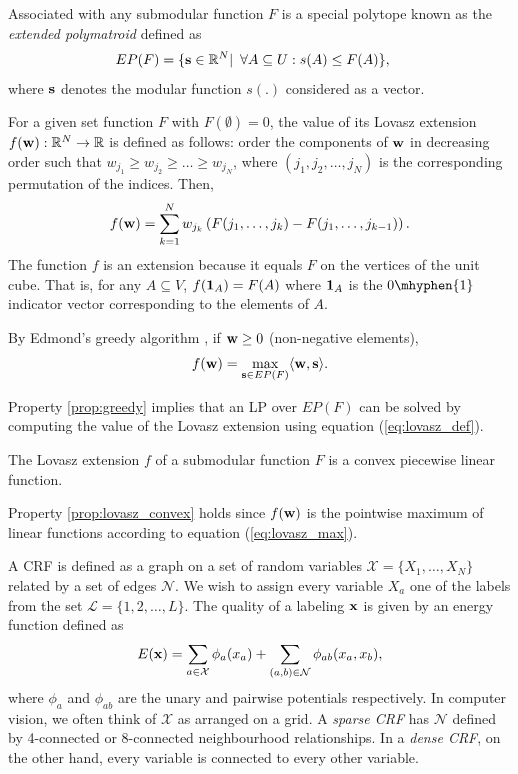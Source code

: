  Associated with any submodular function $F$ is a special polytope known as the {\it extended polymatroid} defined as
%
\begin{align}
EP(F) &= \{{\bf s} \in \mathbb{R}^N | \enskip \forall A \subseteq U: s(A) \leq F(A)\},
\label{eq:epf}
\end{align}
where $\bf s$ denotes the modular function $s(.)$ considered as a vector. 

 For a given set function $F$ with $F(\emptyset) = 0$, the value of its Lovasz extension $f({\bf w}): \mathbb{R}^N \to \mathbb{R}$ is defined as follows: order the components of $\bf w$ in decreasing order such that $w_{j_1} \geq w_{j_2} \geq \dots \geq w_{j_N}$, where $(j_1, j_2, \dots, j_N)$ is the corresponding permutation of the indices. Then,
%
\begin{align}
    f({\bf w}) = \sum_{k = 1}^{N} w_{j_k} \left(F(j_1, \dots, j_k) - F(j_1,
    \dots, j_{k - 1})\right).
    \label{eq:lovasz_def}
\end{align}
%
The function $f$ is an extension because it equals $F$ on the vertices of the
unit cube. That is, for any $A \subseteq V$, $f({\bf 1}_A) = F(A)$ where ${\bf
1}_A$ is the $0\mhyphen{1}$ indicator vector corresponding to the elements of $A$.

{\prop By Edmond's greedy algorithm \citep{edmonds1970submodular}, if ${\bf w} \geq 0$ (non-negative elements), 
\begin{equation}
    f({\bf w}) = \max_{{\bf s} \in EP(F)} \langle {\bf w}, {\bf s} \rangle.
    \label{eq:lovasz_max}
\end{equation}
\label{prop:greedy}}

Property \ref{prop:greedy} implies that an LP over $EP(F)$ can be solved by computing the value of the Lovasz extension using equation (\ref{eq:lovasz_def}).

{\prop The Lovasz extension $f$ of a submodular function $F$ is a convex piecewise linear function.\label{prop:lovasz_convex}}

Property \ref{prop:lovasz_convex} holds since $f({\bf w})$ is the pointwise maximum of linear functions according to equation (\ref{eq:lovasz_max}).

A CRF is defined as a graph on a set of random variables ${\mathcal X} = \{X_1,\dots, X_N\}$ related by a set of edges $\mathcal N$. We wish to assign every variable $X_a$ one of the labels from the set $\mathcal{L} = \{1, 2, \dots, L\}$. The quality of a labeling $\bf x$ is given by an energy function defined as 
%
\begin{equation}
    E({\bf x}) = \sum_{a \in {\mathcal X}} \phi_a(x_a) + \sum_{(a, b) \in {\mathcal N}} \phi_{ab}(x_a, x_b),
    \label{eq:energy_min}
  \end{equation}
%
where $\phi_a$ and $\phi_{ab}$ are the unary and pairwise potentials respectively. In computer vision, we often think of $\mathcal X$ as arranged on a grid. A \emph{sparse CRF} has $\mathcal N$ defined by 4-connected or 8-connected neighbourhood relationships. In a \emph{dense CRF}, on the other hand, every variable is connected to every other variable.

